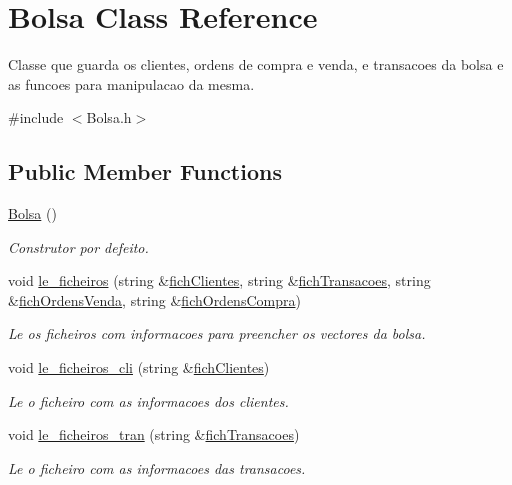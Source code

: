 \hypertarget{class_bolsa}{}\section{Bolsa Class Reference}
\label{class_bolsa}


Classe que guarda os clientes, ordens de compra e venda, e transacoes da bolsa e as funcoes para manipulacao da mesma.  




{\ttfamily \#include $<$Bolsa.\+h$>$}

\subsection*{Public Member Functions}
\begin{DoxyCompactItemize}
\item 
\hyperlink{class_bolsa_a79eb058719d17c21fab6c4b95db8c1b6}{Bolsa} ()
\begin{DoxyCompactList}\small\item\em Construtor por defeito. \end{DoxyCompactList}\item 
void \hyperlink{class_bolsa_aabb97dba1ba1783fbe860058764c6a90}{le\+\_\+ficheiros} (string \&\hyperlink{_utils_8h_a1335b18f135ed58c716b3ddcecdc8cce}{fich\+Clientes}, string \&\hyperlink{_utils_8h_a66ff7fedd13a1b40664042a086ca0f27}{fich\+Transacoes}, string \&\hyperlink{_utils_8h_ad22902af7efe6d185550055b7caa5cbb}{fich\+Ordens\+Venda}, string \&\hyperlink{_utils_8h_acaee3ba642d3be244820a97e5eb5b7f7}{fich\+Ordens\+Compra})
\begin{DoxyCompactList}\small\item\em Le os ficheiros com informacoes para preencher os vectores da bolsa. \end{DoxyCompactList}\item 
void \hyperlink{class_bolsa_a2f295e1c0ddd43401056bde7d6a9bfde}{le\+\_\+ficheiros\+\_\+cli} (string \&\hyperlink{_utils_8h_a1335b18f135ed58c716b3ddcecdc8cce}{fich\+Clientes})
\begin{DoxyCompactList}\small\item\em Le o ficheiro com as informacoes dos clientes. \end{DoxyCompactList}\item 
void \hyperlink{class_bolsa_ab099261f63bff9e274b94bca96cbd2f4}{le\+\_\+ficheiros\+\_\+tran} (string \&\hyperlink{_utils_8h_a66ff7fedd13a1b40664042a086ca0f27}{fich\+Transacoes})
\begin{DoxyCompactList}\small\item\em Le o ficheiro com as informacoes das transacoes. \end{DoxyCompactList}\item 

\end{DoxyCompactItemize}
